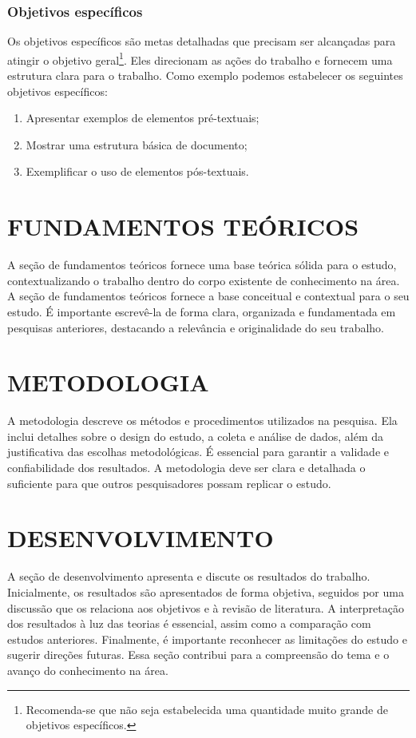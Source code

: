 \documentclass[dissertacao]{iftex2024}
\begin{document}
\subsection{Objetivos específicos}

Os objetivos específicos são metas detalhadas que precisam ser alcançadas para atingir o objetivo geral\footnote{Recomenda-se que não seja estabelecida uma quantidade muito grande de objetivos específicos.}.
Eles direcionam as ações do trabalho e fornecem uma estrutura clara para o trabalho.
Como exemplo podemos estabelecer os seguintes objetivos específicos:
\begin{enumerate}
 \item Apresentar exemplos de elementos pré-textuais;
 \item Mostrar uma estrutura básica de documento;
 \item Exemplificar o uso de elementos pós-textuais.
\end{enumerate}

\chapter{FUNDAMENTOS TEÓRICOS}

A seção de fundamentos teóricos fornece uma base teórica sólida para o estudo, contextualizando o trabalho dentro do corpo existente de conhecimento na área.
A seção de fundamentos teóricos fornece a base conceitual e contextual para o seu estudo.
É importante escrevê-la de forma clara, organizada e fundamentada em pesquisas anteriores, destacando a relevância e originalidade do seu trabalho.

\chapter{METODOLOGIA}

A metodologia descreve os métodos e procedimentos utilizados na pesquisa.
Ela inclui detalhes sobre o design do estudo, a coleta e análise de dados, além da justificativa das escolhas metodológicas.
É essencial para garantir a validade e confiabilidade dos resultados.
A metodologia deve ser clara e detalhada o suficiente para que outros pesquisadores possam replicar o estudo.

\chapter{DESENVOLVIMENTO}

A seção de desenvolvimento apresenta e discute os resultados do trabalho.
Inicialmente, os resultados são apresentados de forma objetiva, seguidos por uma discussão que os relaciona aos objetivos e à revisão de literatura.
A interpretação dos resultados à luz das teorias é essencial, assim como a comparação com estudos anteriores.
Finalmente, é importante reconhecer as limitações do estudo e sugerir direções futuras.
Essa seção contribui para a compreensão do tema e o avanço do conhecimento na área.
\end{document}
